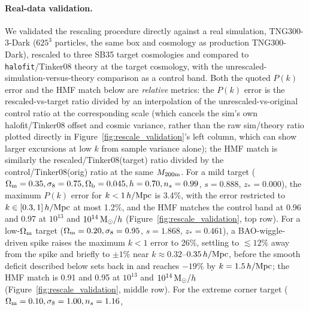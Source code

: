 \documentclass[11pt]{article}
\newcommand{\Msun}{{\rm M}_\odot}
\begin{document}
\paragraph{Real-data validation.} We validated the rescaling procedure
directly against a real simulation, TNG300-3-Dark ($625^3$ particles, the
same box and cosmology as production TNG300-Dark), rescaled to three SB35
target cosmologies and compared to \texttt{halofit}/Tinker08
\citep{tinker2008} theory at the target cosmology, with the
unrescaled-simulation-versus-theory comparison as a control band. Both the
quoted $P(k)$ error and the HMF match below are \emph{relative} metrics: the
$P(k)$ error is the rescaled-vs-target ratio divided by an interpolation of
the unrescaled-vs-original control ratio at the corresponding scale (which
cancels the sim's own halofit/Tinker08 offset and cosmic variance, rather
than the raw sim/theory ratio plotted directly in
Figure~\ref{fig:rescale_validation}'s left column, which can show larger
excursions at low $k$ from sample variance alone); the HMF match is
similarly the rescaled/Tinker08(target) ratio divided by the
control/Tinker08(orig) ratio at the same $M_{200\rm m}$. For a mild
target ($\Omega_{\rm m}=0.35,\sigma_8=0.75,\Omega_{\rm b}=0.045,h=0.70,n_s=0.99$,
$s=0.888$, $z_*=0.000$), the maximum $P(k)$ error for $k<1\,h/{\rm Mpc}$ is
3.4\%, with the error restricted to $k\in[0.3,1]\,h/{\rm Mpc}$ at most
1.2\%, and the HMF matches the control band at 0.96
and 0.97 at $10^{13}$ and $10^{14}\,\Msun/h$ (Figure~\ref{fig:rescale_validation},
top row). %
For a low-$\Omega_{\rm m}$ target ($\Omega_{\rm m}=0.20,\sigma_8=0.95$,
$s=1.868$, $z_*=0.461$), a BAO-wiggle-driven spike raises the maximum $k<1$
error to 26\%, settling to $\lesssim12\%$ away from the spike and briefly to
$\pm1\%$ near $k\approx0.32$--$0.35\,h/{\rm Mpc}$, before the smooth deficit
described below sets back in and reaches $-19\%$ by $k=1.5\,h/{\rm Mpc}$;
the HMF match is 0.91 and 0.95 at $10^{13}$ and $10^{14}\,\Msun/h$
(Figure~\ref{fig:rescale_validation}, middle row). %
For the extreme corner target ($\Omega_{\rm m}=0.10,\sigma_8=1.00,n_s=1.16$,
\end{document}
